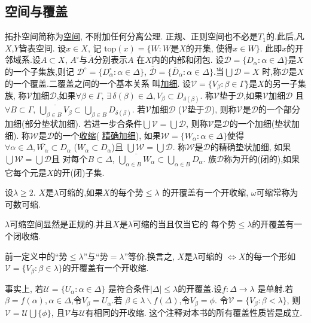 \documentclass[main.tex]{subfiles}
\begin{document}
\subsection{空间与覆盖}\label{ch1.1.2}
拓扑空间简称为\underline{空间}, 不附加任何分离公理.
正规、正则空间也不必是$T_1$的.此后,凡$X$,$Y$皆表空间.
设$x\in X$, 记
$\textrm{top}(x) = \{W: W$是$X$的开集, 使得$ x\in W\}$.
此即$x$的开邻域系.设$A\subset X$, $A^\circ$与$\overline{A}$分别表示$A$ 在$X$内的内部和闭包.
设$\mathscr{D}=\{D_\alpha:\alpha\in\Delta\}$是$X$的一个子集族,则记
$\mathscr{D}^\circ=\{D^\circ_\alpha:\alpha\in\Delta\}$,
$\overline{\mathscr{D}}=\{\overline{D}_\alpha:\alpha\in\Delta\}$.当$\bigcup\mathscr{D} = X$
时,称$\mathscr{D}$是$X$的一个覆盖.二覆盖之间的一个基本关系
叫\underline{加细}.
设$\mathscr{V}=\{V_\beta:\beta\in\Gamma\}$是$X$的另一子集族,
称$\mathscr{V}$加细$\mathscr{D}$,如果$\forall\beta\in\Gamma$, 
$\exists\, \delta (\beta)\in\Delta, V_\beta\subset D_{\delta(\beta)}$.
称$\mathscr{V}$垫于$\mathscr{D}$,如果$\mathscr{V}$加细$\mathscr{D}$
且$\forall B\subset\Gamma$, 
$\overline{\bigcup_{\beta\in B}V_\beta}\subset \bigcup_{\beta\in B}D_{\delta(\beta)}$.
若$\mathscr{V}$加细$\mathscr{D}$
($\mathscr{V}$垫于$\mathscr{D}$),
则称$\mathscr{V}$是$\mathscr{D}$的一个部分加细(部分垫状加细).
若进一步合条件$\bigcup\mathscr{V}=\bigcup\mathscr{D}$,
则称$\mathscr{V}$是$\mathscr{D}$的一个加细(垫状加细).
称$\mathscr{W}$是$\mathscr{D}$的一个\underline{收缩}(
\underline{精确加细}),
如果$\mathscr{W}=\{W_\alpha: \alpha\in\Delta\}$使得
$\forall\alpha\in \Delta, \overline{W_\alpha}\subset D_\alpha$
($W_\alpha\subset D_\alpha$)且
$\bigcup\mathscr{W}  = \bigcup \mathscr{D}$.
称$\mathscr{W}$是$\mathscr{D}$的精确垫状加细,
如果$\bigcup\mathscr{W}  = \bigcup \mathscr{D}$且
对每个$B\subset \Delta$, 
$\overline{\bigcup_{\alpha\in B}W_\alpha}  \subset \bigcup_{\alpha\in B}D_\alpha$.
族$\mathscr{D}$称为开的(闭的),如果它每个元是$X$的开(闭)子集.

\begin{definition}
设$\lambda \ge2$. $X$是$\lambda$可缩的,如果$X$的每个势$\le \lambda$
的开覆盖有一个开收缩, $\omega$可缩常称为可数可缩.
\end{definition}
$\lambda$可缩空间显然是正规的.并且$X$是$\lambda$可缩的当且仅当它的
每个势$\le \lambda$的开覆盖有一个闭收缩.

\begin{note}\begin{songti}
前一定义中的“势$\le \lambda$”与“势$= \lambda$”等价.换言之,
$X$是$\lambda$可缩的 $\Leftrightarrow X$的每一个形如
$\mathscr{V}=\{V_\beta: \beta\in\lambda\}$的开覆盖有一个开收缩. 

事实上, 若$\mathscr{U}=\{U_\alpha: \alpha\in\Delta\}$
是符合条件$|\Delta|\le\lambda$的开覆盖.设$f: \Delta\to\lambda$
是单射.若$\beta=f(\alpha), \alpha\in\Delta$,令$V_\beta=U_\alpha$.若
$\beta\in \lambda\backslash f(\Delta)$,令$V_\beta=\phi$. 
令$\mathscr{V}=\{V_\beta: \beta < \lambda\}$,
则$\mathscr{V}=\mathscr{U}\bigcup\{\phi\}$, 且$\mathscr{V}$与$\mathscr{U}$有相同的开收缩.
这个注释对本书的所有覆盖性质皆是成立.
\end{songti}
\end{note}
\end{document}
